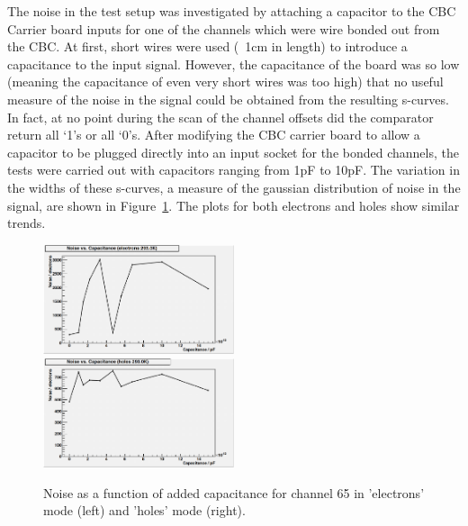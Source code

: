 The noise in the test setup was investigated by attaching a capacitor to the CBC Carrier board inputs for one
of the channels which were wire bonded out from the CBC. At first, short wires were used (~1cm in length) to
introduce a capacitance to the input signal. However, the capacitance of the board was so low (meaning the
capacitance of even very short wires was too high) that no useful measure of the noise in the signal could be
obtained from the resulting s-curves. In fact, at no point during the scan of the channel offsets did the
comparator return all ‘1’s or all ‘0’s. After modifying the CBC carrier board to allow a capacitor to be
plugged directly into an input socket for the bonded channels, the tests were carried out with capacitors
ranging from 1pF to 10pF. The variation in the widths of these s-curves, a measure of the gaussian
distribution of noise in the signal, are shown in Figure~\ref{fig:noise_v_capacitance}. The plots for both
electrons and holes show similar trends.

\begin{figure}[hbtp]
   \centering
     \includegraphics[width=0.5\textwidth]{Chapters/07_Appendices/07d_ServiceWork/Images/noise_v_capacitance_ch_65_electrons}\hfill
     \includegraphics[width=0.5\textwidth]{Chapters/07_Appendices/07d_ServiceWork/Images/noise_v_capacitance_ch_65_holes}\hfill
     \caption{Noise as a function of added capacitance for channel 65 in 'electrons' mode (left) and 'holes'
     mode (right).}
     \label{fig:noise_v_capacitance}
\end{figure}

